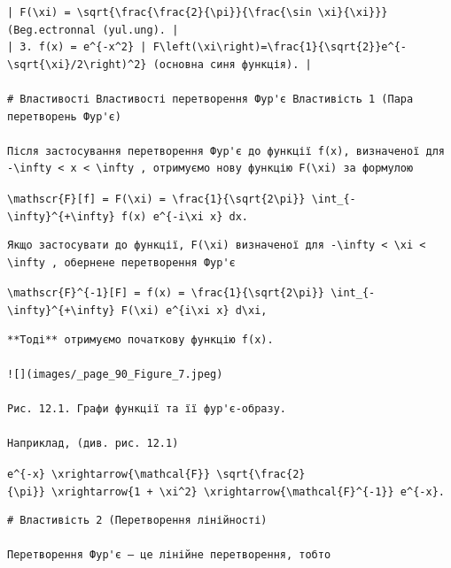 \documentclass[
  ukrainian,
]{article}
\begin{document}
\begin{verbatim}
| F(\xi) = \sqrt{\frac{\frac{2}{\pi}}{\frac{\sin \xi}{\xi}}} (Beg.ectronnal (yul.ung). |
| 3. f(x) = e^{-x^2} | F\left(\xi\right)=\frac{1}{\sqrt{2}}e^{-\sqrt{\xi}/2\right)^2} (основна синя функція). |

# Властивості Властивості перетворення Фур'є Властивість 1 (Пара перетворень Фур'є)

Після застосування перетворення Фур'є до функції f(x), визначеної для -\infty < x < \infty , отримуємо нову функцію F(\xi) за формулою
\end{verbatim}

\texttt{\textbackslash{}mathscr\{F\}{[}f{]}\ =\ F(\textbackslash{}xi)\ =\ \textbackslash{}frac\{1\}\{\textbackslash{}sqrt\{2\textbackslash{}pi\}\}\ \textbackslash{}int\_\{-\textbackslash{}infty\}\^{}\{+\textbackslash{}infty\}\ f(x)\ e\^{}\{-i\textbackslash{}xi\ x\}\ dx.}

\begin{verbatim}
Якщо застосувати до функції, F(\xi) визначеної для -\infty < \xi < \infty , обернене перетворення Фур'є
\end{verbatim}

\texttt{\textbackslash{}mathscr\{F\}\^{}\{-1\}{[}F{]}\ =\ f(x)\ =\ \textbackslash{}frac\{1\}\{\textbackslash{}sqrt\{2\textbackslash{}pi\}\}\ \textbackslash{}int\_\{-\textbackslash{}infty\}\^{}\{+\textbackslash{}infty\}\ F(\textbackslash{}xi)\ e\^{}\{i\textbackslash{}xi\ x\}\ d\textbackslash{}xi,}

\begin{verbatim}
**Тоді** отримуємо початкову функцію f(x).

![](images/_page_90_Figure_7.jpeg)

Рис. 12.1. Графи функції та її фур'є-образу.

Наприклад, (див. рис. 12.1)
\end{verbatim}

\texttt{e\^{}\{-\textbar{}x\textbar{}\}\ \textbackslash{}xrightarrow\{\textbackslash{}mathcal\{F\}\}\ \textbackslash{}sqrt\{\textbackslash{}frac\{2\}\{\textbackslash{}pi\}\}\ \textbackslash{}xrightarrow\{1\ +\ \textbackslash{}xi\^{}2\}\ \textbackslash{}xrightarrow\{\textbackslash{}mathcal\{F\}\^{}\{-1\}\}\ e\^{}\{-\textbar{}x\textbar{}\}.}

\begin{verbatim}
# Властивість 2 (Перетворення лінійності)

Перетворення Фур'є — це лінійне перетворення, тобто
\end{verbatim}
\end{document}
